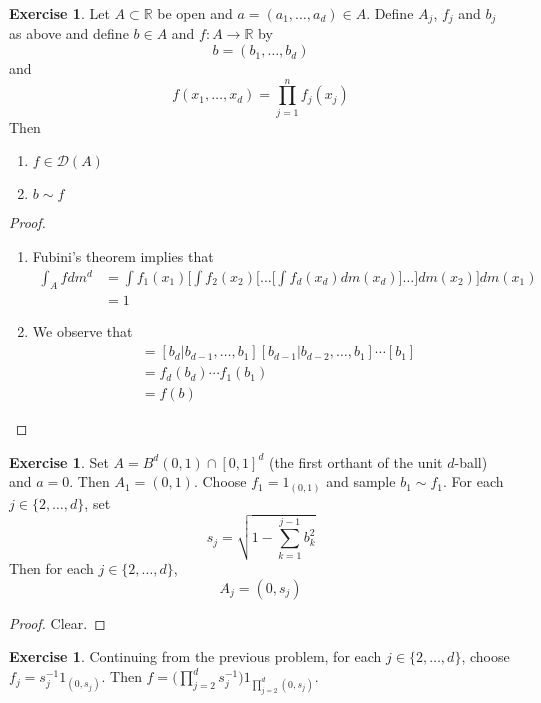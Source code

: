 \documentclass[12pt]{amsart}
\theoremstyle{definition}
\theoremstyle{remark}
\theoremstyle{definition}
\newtheorem{ex}[definition]{Exercise}
\newcommand{\R}{\mathbb{R}}
\newcommand{\MD}{\mathcal{D}}
\begin{document}
	\begin{ex}
	Let $A \subset \R$ be open and $a = (a_1, \dots, a_d) \in A$. Define $A_j$, $f_j$ and $b_j$ as above and define $b \in A$ and $f: A \rightarrow \R$ by $$b = (b_1, \dots, b_d)$$ and  $$f(x_1, \dots, x_d) = \prod_{j=1}^nf_j(x_j)$$ 
	Then 
	\begin{enumerate}
	\item $f \in \MD(A)$ 
	\item $b \sim f$
	\end{enumerate}
	\end{ex}
	
	\begin{proof}
	\begin{enumerate}
	\item Fubini's theorem implies that 
	\begin{align*}
	\int_A f dm^d
	&= \int f_1(x_1) \bigg[ \int f_2(x_2) \bigg[ \dots \bigg[ \int f_d(x_d) dm(x_d) \bigg] \dots \bigg] dm(x_2) \bigg] dm(x_1) \\
	&= 1
	\end{align*} 
	\item We observe that 
	\begin{align*}
	[b] 
	&= [b_d| b_{d-1}, \ldots, b_1][b_{d-1}| b_{d-2}, \ldots, b_1] \cdots [b_1] \\
	&= f_d(b_d) \cdots f_1(b_1) \\
	&= f(b)
	\end{align*}
	
	\end{enumerate}
	\end{proof}
	
	\begin{ex}
	Set $A = B^d(0, 1) \cap [0,1]^d$ (the first orthant of the unit $d$-ball) and $a = 0$. Then $A_1 = (0,1)$. Choose $f_1 = 1_{(0,1)}$ and sample $b_1 \sim f_1$. For each $j \in \{2, \ldots, d\}$, set $$s_j = \sqrt{1 - \sum_{k=1}^{j-1} b^2_k}$$ 
	Then for each $j \in \{2, \ldots, d\}$, $$A_j = ( 0, s_j)$$ 
	\end{ex}
	
	\begin{proof}
	Clear.
	\end{proof}
	
	\begin{ex}
	Continuing from the previous problem, for each $j \in \{2, \ldots, d\}$, choose $f_j = s_j^{-1}1_{(0, s_j )}$. Then $f	 = \bigg( \prod_{j=2}^ds^{-1}_j \bigg) 1_{\prod_{j=2}^d (0, s_j)}$. 
	\end{ex}
	
\end{document}
